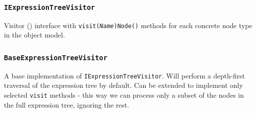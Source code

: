 \documentclass[12pt,oneside,a4paper,notitlepage]{report}
\begin{document}
	\subsubsection{\texttt{IExpressionTreeVisitor}}
	\par Visitor (\cite{patternbook}) interface with \texttt{visit(\textit{Name})Node()} methods for each concrete node type in the object model.

	\subsubsection{\texttt{BaseExpressionTreeVisitor}}
	\par A base implementation of \texttt{IExpressionTreeVisitor}. Will perform a depth-first traversal of the expression tree by default. Can be extended to implement only selected \texttt{visit} methods - this way we can process only a subset of the nodes in the full expression tree, ignoring the rest.

	\printbibliography[
		title=Sources
	]
\end{document}
